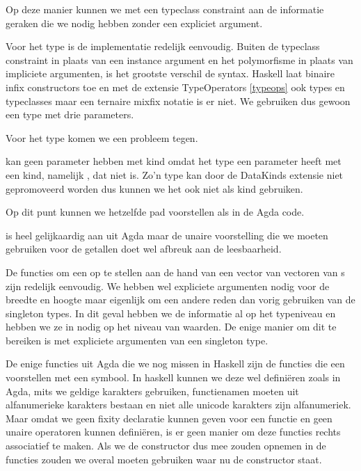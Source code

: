 
Op deze manier kunnen we met een typeclass constraint aan de informatie geraken
die we nodig hebben zonder een expliciet argument.

Voor het  type is de implementatie redelijk eenvoudig. Buiten de
typeclass constraint in plaats van een instance argument en het polymorfisme in
plaats van impliciete argumenten, is het grootste verschil de syntax. Haskell
laat binaire infix constructors toe en met de extensie TypeOperators
\ref{typeops} ook types en typeclasses maar een ternaire mixfix notatie is er
niet. We gebruiken dus gewoon een type met drie parameters.


Voor het type  komen we een probleem tegen.


 kan geen parameter hebben met kind  omdat het
type  een parameter heeft met een kind, namelijk
, dat niet \ihask{*} is. Zo'n type kan door de DataKinds extensie
niet gepromoveerd worden dus kunnen we het ook niet als kind gebruiken.

Op dit punt kunnen we hetzelfde pad voorstellen als in de Agda code.


 is heel gelijkaardig aan  uit Agda maar de unaire
voorstelling die we moeten gebruiken voor de getallen doet wel afbreuk aan de
leesbaarheid.

De functies om een  op te stellen aan de hand van een vector van
vectoren van s zijn redelijk eenvoudig. We hebben wel
expliciete argumenten nodig voor de breedte en hoogte maar eigenlijk om een
andere reden dan vorig gebruiken van de singleton types. In dit geval hebben we
de informatie al op het typeniveau en hebben we ze in 
nodig op het niveau van waarden. De enige manier om dit te bereiken is met
expliciete argumenten van een singleton type.


De enige functies uit Agda die we nog missen in Haskell zijn de functies die
een  voorstellen met een symbool. In haskell kunnen we deze wel
definiëren zoals in Agda, mits we geldige karakters gebruiken, functienamen
moeten uit alfanumerieke karakters bestaan en niet alle unicode karakters zijn
alfanumeriek. Maar omdat we geen fixity declaratie kunnen geven voor een
functie en geen unaire operatoren kunnen definiëren, is er geen manier om deze
functies rechts associatief te maken. Als we de constructor \ihask{(:>)} dus
mee zouden opnemen in de functies zouden we overal \ihask{\$} moeten gebruiken
waar nu de constructor staat.

